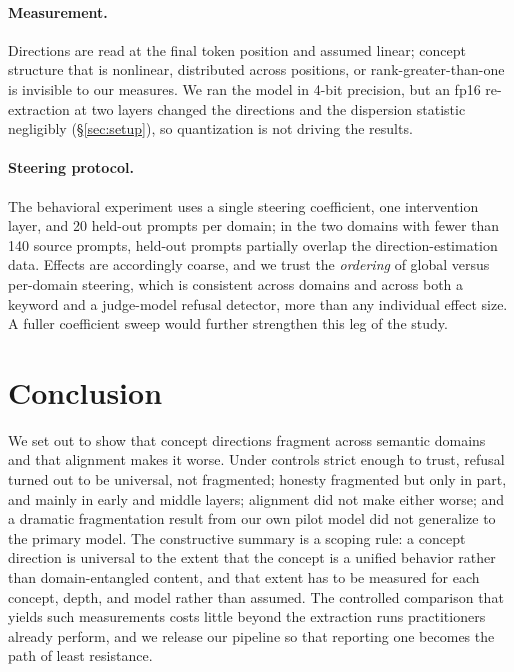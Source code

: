 \documentclass[11pt]{article}
\begin{document}
\paragraph{Measurement.}
Directions are read at the final token position and assumed linear;
concept structure that is nonlinear, distributed across positions, or
rank-greater-than-one is invisible to our measures. We ran the model in
4-bit precision, but an fp16 re-extraction at two layers changed the
directions and the dispersion statistic negligibly
(\S\ref{sec:setup}), so quantization is not driving the results.

\paragraph{Steering protocol.}
The behavioral experiment uses a single steering coefficient, one
intervention layer, and 20 held-out prompts per domain; in the two domains
with fewer than 140 source prompts, held-out prompts partially overlap the
direction-estimation data. Effects are accordingly coarse, and we trust the
\emph{ordering} of global versus per-domain steering, which is consistent
across domains and across both a keyword and a judge-model refusal detector,
more than any individual effect size. A fuller coefficient sweep would
further strengthen this leg of the study.


\section{Conclusion}
\label{sec:conclusion}

We set out to show that concept directions fragment across semantic domains
and that alignment makes it worse. Under controls strict enough to trust,
refusal turned out to be universal, not fragmented; honesty fragmented but
only in part, and mainly in early and middle layers; alignment did not make
either worse; and a dramatic fragmentation result from our own pilot model
did not generalize to the primary model. The constructive summary is a scoping rule: a concept direction is universal
to the extent that the concept is a unified behavior rather than
domain-entangled content, and that extent has to be measured for each
concept, depth, and model rather than assumed. The controlled comparison
that yields such measurements costs little beyond the extraction runs
practitioners already perform, and we release our pipeline so that reporting
one becomes the path of least resistance.
\end{document}
